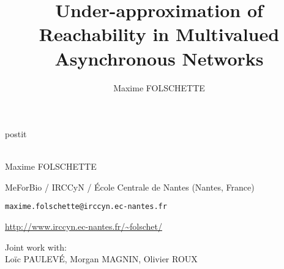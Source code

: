 \documentclass[fleqn,8pt,t]{beamer}
\date{\thedate}
\title[Under-approximation of Reachability in Multivalued Asynchronous Networks]{Under-approximation of Reachability in Multivalued Asynchronous Networks}
\author{Maxime FOLSCHETTE}
\newcommand{\ex}[1]{\textcolor{couleurex}{#1}}
\newcommand{\tcite}[1]{\textcolor{couleurcit}{[#1]}}
\newcommand{\tval}[1]{\textbf{#1}}
\begin{document}
\begin{frame}[plain,label=title]

\begin{center}
\vspace{1cm}
\begin{beamercolorbox}[sep=0.5em]{postit}
\centering
\Large
\textbf{%
{\normalsize\theconference{}}\\~\\%
\inserttitle
}
\end{beamercolorbox}

\par
\medskip
\bigskip
\normalsize
Maxime FOLSCHETTE

\medskip
\footnotesize
MeForBio / IRCCyN / École Centrale de Nantes (Nantes, France)

\texttt{maxime.folschette@irccyn.ec-nantes.fr}

\url{http://www.irccyn.ec-nantes.fr/~folschet/}

\bigskip
Joint work with:
\\
\normalsize
Loïc PAULEVÉ, Morgan MAGNIN, Olivier ROUX
\end{center}

\end{frame}





\newcommand{\citeegfra}{\quad\tval{\ex{egfr20}}: \tcite{Epidermal Growth Factor Receptor, by Özgür Sahin \textit{et al.}}}
\newcommand{\citeegfrb}{\quad\tval{\ex{egfr104}}: \tcite{Epidermal Growth Factor Receptor, by Regina Samaga \textit{et al.}}}
\newcommand{\citetcrsiga}{\quad\tval{\ex{tcrsig40}}: \tcite{T-Cell Receptor Signaling, by Steffen Klamt \textit{et al.}}}
\newcommand{\citetcrsigb}{\quad\tval{\ex{tcrsig94}}: \tcite{T-Cell Receptor Signaling, by Julio Saez-Rodriguez \textit{et al.}}}

\newcommand{\citemodels}{\bigskip\citeegfra\\\citeegfrb\\\citetcrsiga\\\citetcrsigb}

\newcommand{\citepmrtcsb}{Paulevé, Magnin, Roux in Transactions on Computational Systems Biology, 2011}
\newcommand{\citepmrmscs}{Paulevé, Magnin, Roux in Mathematical Structures in Computer Science, 2012}
\newcommand{\citefpimrcmsb}{{\scriptsize Folschette, Paulevé, Inoue, Magnin, Roux in Computational Methods in Systems Biology, 2012}}
\newcommand{\citedejong}{De Jong in Journal of Computational Biology, 2002}
\newcommand{\citerichardcomet}{Richard, Comet. Discrete Applied Mathematics, 2007}
\end{document}
